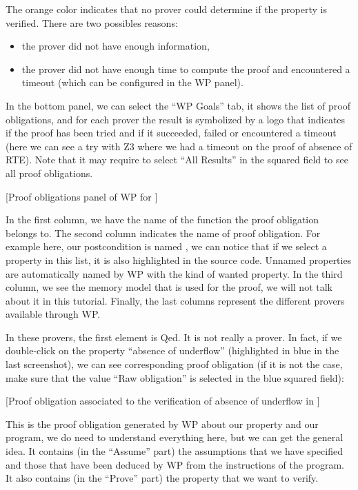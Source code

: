 The orange color indicates that no prover could determine if the
property is verified. There are two possibles reasons:



\begin{itemize}
\item the prover did not have enough information,
\item the prover did not have enough time to compute the proof and
  encountered a timeout (which can be configured in the WP panel).
\end{itemize}


In the bottom panel, we can select the ``WP Goals'' tab, it shows the
list of proof obligations, and for each prover the result is symbolized
by a logo that indicates if the proof has been tried and if it
succeeded, failed or encountered a timeout (here we can see a try with
Z3 where we had a timeout on the proof of absence of RTE). Note that it
may require to select ``All Results'' in the squared field to see all
proof obligations.


[Proof obligations panel of WP for ]


In the first column, we have the name of the function the proof
obligation belongs to. The second column indicates the name of proof
obligation. For example here, our postcondition is named
, we can notice
that if we select a property in this list, it is also highlighted in the
source code. Unnamed properties are automatically named by WP with the
kind of wanted property. In the third column, we see the memory model
that is used for the proof, we will not talk about it in this tutorial.
Finally, the last columns represent the different provers available
through WP.



In these provers, the first element is Qed. It is not really a prover.
In fact, if we double-click on the property ``absence of underflow''
(highlighted in blue in the last screenshot), we can see corresponding
proof obligation (if it is not the case, make sure that the value ``Raw
obligation'' is selected in the blue squared field):



[Proof obligation associated to the verification of absence of
  underflow in ]


This is the proof obligation generated by WP about our property and our
program, we do need to understand everything here, but we can get the
general idea. It contains (in the ``Assume'' part) the assumptions that
we have specified and those that have been deduced by WP from the
instructions of the program. It also contains (in the ``Prove'' part)
the property that we want to verify.



